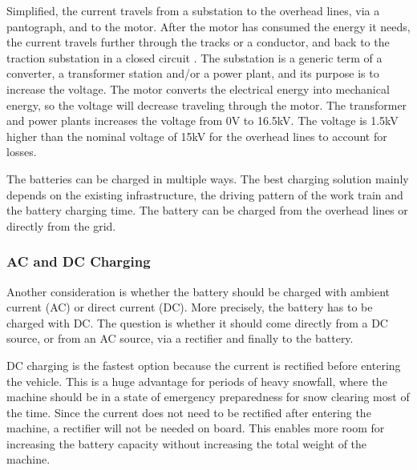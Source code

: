 \documentclass{article}
\begin{document}
Simplified, the current travels from a substation to the overhead lines, via a pantograph, and to the motor. After the motor has consumed the energy it needs, the current travels further through the tracks or a conductor, and back to the traction substation in a closed circuit \cite{bn_3}.%
The substation is a generic term of a converter, a transformer station and/or a power plant, and its purpose is to increase the voltage\cite{bn_2}. %
The motor converts the electrical energy into mechanical energy, so the voltage will decrease traveling through the motor. The transformer and power plants increases the voltage from 0V to 16.5kV\cite{bn_2}. %
The voltage is 1.5kV higher than the nominal voltage of 15kV for the overhead lines to account for losses\cite{bn_2}. %

The batteries can be charged in multiple ways. The best charging solution mainly depends on the existing infrastructure, the driving pattern of the work train and the battery charging time. The battery can be charged from the overhead lines or directly from the grid.

\subsubsection*{AC and DC Charging}

Another consideration is whether the battery should be charged with ambient current (AC) or direct current (DC). More precisely, the battery has to be charged with DC. The question is whether it should come directly from a DC source, or from an AC source, via a rectifier and finally to the battery.

DC charging is the fastest option because the current is rectified before entering the vehicle. This is a huge advantage for periods of heavy snowfall, where the machine should be in a state of emergency preparedness for snow clearing most of the time. Since the current does not need to be rectified after entering the machine, a rectifier will not be needed on board. This enables more room for increasing the battery capacity without increasing the total weight of the machine.
\end{document}
